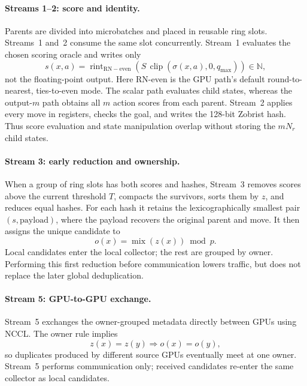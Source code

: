 \documentclass[10pt,twocolumn]{article}
\begin{document}
\paragraph{Streams 1--2: score and identity.}
Parents are divided into microbatches and placed in reusable ring slots.
Streams~1 and~2 consume the same slot concurrently.  Stream~1 evaluates the
chosen scoring oracle and writes only
\begin{equation}
 s(x,a)=\operatorname{rint}_{\mathrm{RN-even}}
 \left(S\,\operatorname{clip}(\sigma(x,a),0,q_{\max})\right)
 \in\mathbb{N},
 \label{eq:score}
\end{equation}
not the floating-point output.  Here RN-even is the GPU path's default
round-to-nearest, ties-to-even mode.  The scalar path evaluates child states, whereas
the output-$m$ path obtains all $m$ action scores from each parent.  Stream~2
applies every move in registers, checks the goal, and writes the 128-bit Zobrist
hash.  Thus score evaluation and state manipulation overlap without storing the
$mN_r$ child states.

\paragraph{Stream 3: early reduction and ownership.}
When a group of ring slots has both scores and hashes, Stream~3 removes scores
above the current threshold $T$, compacts the survivors, sorts them by $z$, and
reduces equal hashes.  For each hash it retains the lexicographically smallest
pair $(s,\mathrm{payload})$, where the payload recovers the original parent and
move.  It then assigns the unique candidate to
\begin{equation}
 o(x)=\operatorname{mix}(z(x))\bmod p.
 \label{eq:owner}
\end{equation}
Local candidates enter the local collector; the rest are grouped by owner.
Performing this first reduction before communication lowers traffic, but does
not replace the later global deduplication.

\paragraph{Stream 5: GPU-to-GPU exchange.}
Stream~5 exchanges the owner-grouped metadata directly between GPUs using
NCCL.  The owner rule implies
\begin{equation}
 z(x)=z(y)\Longrightarrow o(x)=o(y),
 \label{eq:owner_invariant}
\end{equation}
so duplicates produced by different source GPUs eventually meet at one owner.
Stream~5 performs communication only; received candidates re-enter the same
collector as local candidates.
\end{document}
